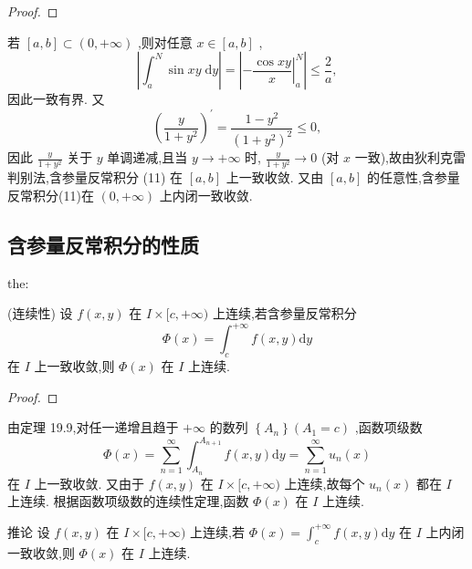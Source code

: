 \begin{proof}

\end{proof}
若 \(\left\lbrack  {a,b}\right\rbrack   \subset  \left( {0, + \infty }\right)\) ,则对任意 \(x \in  \left\lbrack  {a,b}\right\rbrack\) ,
\[
\left| {{\int }_{a}^{N}\sin {xy}\mathrm{\;d}y}\right|  = \left| {-{\left. \frac{\cos {xy}}{x}\right| }_{a}^{N}}\right|  \leq  \frac{2}{a},
\]
因此一致有界. 又
\[
{\left( \frac{y}{1 + {y}^{2}}\right) }^{\prime } = \frac{1 - {y}^{2}}{{\left( 1 + {y}^{2}\right) }^{2}} \leq  0,
\]
因此 \(\frac{y}{1 + {y}^{2}}\) 关于 \(y\) 单调递减,且当 \(y \rightarrow   + \infty\) 时, \(\frac{y}{1 + {y}^{2}} \rightarrow  0\) (对 \(x\) 一致),故由狄利克雷判别法,含参量反常积分 (11) 在 \(\left\lbrack  {a,b}\right\rbrack\) 上一致收敛. 又由 \(\left\lbrack  {a,b}\right\rbrack\) 的任意性,含参量反常积分(11)在 \(\left( {0, + \infty }\right)\) 上内闭一致收敛.

\subsection{含参量反常积分的性质}

\begin{theorem}{}{the:}

\end{theorem}
 (连续性) 设 \(f\left( {x,y}\right)\) 在 \(I \times  \lbrack c, + \infty )\) 上连续,若含参量反常积分
\[
\Phi \left( x\right)  = {\int }_{c}^{+\infty }f\left( {x,y}\right) \mathrm{d}y \tag{12}
\]
在 \(I\) 上一致收敛,则 \(\Phi \left( x\right)\) 在 \(I\) 上连续.

\begin{proof}

\end{proof}
由定理 19.9,对任一递增且趋于 \(+ \infty\) 的数列 \(\left\{  {A}_{n}\right\}  \left( {{A}_{1} = c}\right)\) ,函数项级数
\[
\Phi \left( x\right)  = \mathop{\sum }\limits_{{n = 1}}^{\infty }{\int }_{{A}_{n}}^{{A}_{n + 1}}f\left( {x,y}\right) \mathrm{d}y = \mathop{\sum }\limits_{{n = 1}}^{\infty }{u}_{n}\left( x\right)  \tag{13}
\]
在 \(I\) 上一致收敛. 又由于 \(f\left( {x,y}\right)\) 在 \(I \times  \lbrack c, + \infty )\) 上连续,故每个 \({u}_{n}\left( x\right)\) 都在 \(I\) 上连续. 根据函数项级数的连续性定理,函数 \(\Phi \left( x\right)\) 在 \(I\) 上连续.

推论 设 \(f\left( {x,y}\right)\) 在 \(I \times  \lbrack c, + \infty )\) 上连续,若 \(\Phi \left( x\right)  = {\int }_{c}^{+\infty }f\left( {x,y}\right) \mathrm{d}y\) 在 \(I\) 上内闭一致收敛,则 \(\Phi \left( x\right)\) 在 \(I\) 上连续.

